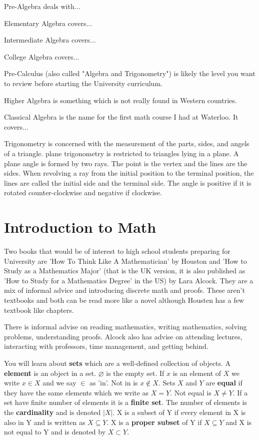 \documentclass[openany,10pt]{book}
\begin{document}
Pre-Algebra deals with... 

Elementary Algebra covers...

Intermediate Algebra covers...

College Algebra covers...

Pre-Calculus (also called "Algebra and Trigonometry") is likely the level you want to review before starting the University curriculum.

Higher Algebra is something which is not really found in Western countries.

Classical Algebra is the name for the first math course I had at Waterloo.  It covers...

Trigonometry is concerned with the measurement of the parts, sides, and angels of a triangle.  plane trigonometry is restricted to triangles lying in a plane.  A plane angle is formed by two rays.  The point is the vertex and the lines are the sides.  When revolving a ray from the initial position to the terminal position, the lines are called the initial side and the terminal side.  The angle is positive if it is rotated counter-clockwise and negative if clockwise.

\chapter{Introduction to Math}

Two books that would be of interest to high school students preparing for University are 'How To Think Like A Mathematician' by Houston and 'How to Study as a Mathematics Major' (that is the UK version, it is also published as 'How to Study for a Mathematics Degree' in the US) by Lara Alcock.  They are a mix of informal advice and introducing discrete math and proofs.  These aren't textbooks and both can be read more like a novel although Housten has a few textbook like chapters.

There is informal advise on reading mathematics, writing mathematics, solving problems, understanding proofs.  Alcock also has advise on attending lectures, interacting with professors, time management, and getting behind.

You will learn about \textbf{sets} which are a well-defined collection of objects.  A \textbf{element} is an object in a set.  $\varnothing$ is the empty set.  If $x$ is an element of $X$ we write $x\in X$ and we say $\in$ as 'in'.  Not in is $x\notin X$. Sets $X$ and $Y$ are \textbf{equal} if they have the same elements which we write as $X=Y$.  Not equal is $X\neq Y$. If a set have finite number of elements it is a \textbf{finite set}.  The number of elements is the \textbf{cardinality} and is denoted $|X|$.  X is a subset of Y if every element in X is also in Y and is written as $X\subseteq Y$.  X is a \textbf{proper subset} of Y if $X\subseteq Y$ and X is not equal to Y and is denoted by $X\subset Y$.  
\end{document}
